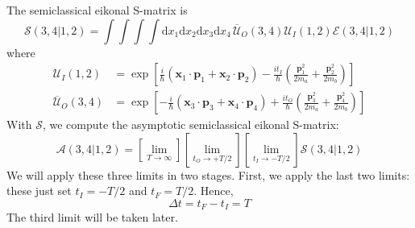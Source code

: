 The semiclassical eikonal S-matrix is
\begin{equation}
	\mathcal{S}(3,4|1,2) = \int \int \int \int \mathrm{d}x_{1} \mathrm{d}x_{2} \mathrm{d}x_{3} \mathrm{d}x_{4} \, \overline{\mathcal{U}}_{O}(3,4) \mathcal{U}_{I}(1,2) \mathcal{E}(3,4|1,2)
\end{equation}
where
\begin{align}
	\mathcal{U}_{I}(1,2) &= \exp{\left[ \frac{i}{\hbar} \left( \mathbf{x}_{1} \cdot \mathbf{p}_{1} + \mathbf{x}_{2} \cdot \mathbf{p}_{2} \right) - \frac{i t_{I}}{\hbar} \left( \frac{\mathbf{p}_{1}^{2}}{2 m_{a}} + \frac{\mathbf{p}_{2}^{2}}{2 m_{b}} \right) \right]} \\
	\overline{\mathcal{U}}_{O}(3,4) &= \exp{\left[ -\frac{i}{\hbar} \left( \mathbf{x}_{3} \cdot \mathbf{p}_{3} + \mathbf{x}_{4} \cdot \mathbf{p}_{4} \right) + \frac{i t_{O}}{\hbar} \left( \frac{\mathbf{p}_{3}^{2}}{2 m_{a}} + \frac{\mathbf{p}_{4}^{2}}{2 m_{b}} \right) \right]}
\end{align}
With $\mathcal{S}$, we compute the asymptotic semiclassical eikonal S-matrix:
\begin{equation}
	\mathcal{A}(3,4|1,2) = \left[ \lim_{T \rightarrow \infty} \right] \left[ \lim_{t_{O} \rightarrow + T/2} \right] \left[ \lim_{t_{I} \rightarrow - T/2} \right] \mathcal{S}(3,4|1,2)
\end{equation}
We will apply these three limits in two stages. First, we apply the last two limits: these just set $t_{I} = -T/2$ and $t_{F} = T/2$. Hence,
\begin{equation}
	\Delta t = t_{F} - t_{I} = T 
\end{equation}
The third limit will be taken later.

